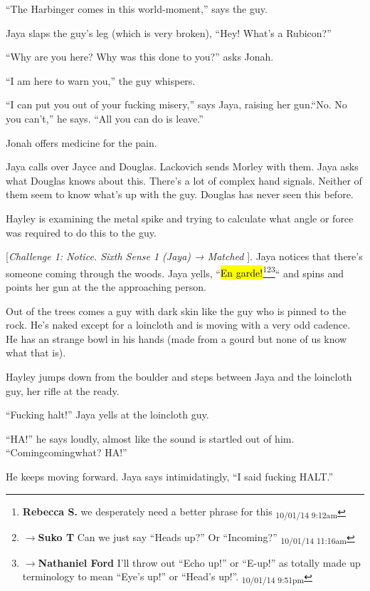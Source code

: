``The Harbinger comes in this world-moment,'' says the guy.

Jaya slaps the guy's leg (which is very broken), ``Hey!  What's a Rubicon?''

``Why are you here? Why was this done to you?'' asks Jonah.

``I am here to warn you,'' the guy whispers.

``I can put you out of your fucking misery,'' says Jaya, raising her gun.``No.  No you can't,'' he says.  ``All you can do is leave.''

Jonah offers medicine for the pain.

Jaya calls over Jayce and Douglas.  Lackovich sends Morley with them.  Jaya asks what Douglas knows about this. There's a lot of complex hand signals.  Neither of them seem to know what's up with the guy.  Douglas has never seen this before.

Hayley is examining the metal spike and trying to calculate what angle or force was required to do this to the guy.  



{[}\textit{Challenge 1: Notice.  Sixth Sense 1 (Jaya) → Matched }{]}.  Jaya notices that there's someone coming through the woods.  Jaya yells, ``\hl{En garde!}\footnote{\textbf{Rebecca S. }we desperately need a better phrase for this \textsubscript{10/01/14 9:12am}}\footnote{$\rightarrow$\textbf{Suko T }Can we just say ``Heads up?''  Or ``Incoming?'' \textsubscript{10/01/14 11:16am}}\footnote{$\rightarrow$\textbf{Nathaniel Ford }I'll throw out ``Echo up!'' or ``E-up!'' as totally made up terminology to mean ``Eye's up!'' or ``Head's up!''. \textsubscript{10/01/14 9:51pm}}`` and spins and points her gun at the the approaching person.

Out of the trees comes a guy with dark skin like the guy who is pinned to the rock.  He's naked except for a loincloth and is moving with a very odd cadence.  He has an strange bowl in his hands (made from a gourd but none of us know what that is).

Hayley jumps down from the boulder and steps between Jaya and the loincloth guy, her rifle at the ready.

``Fucking halt!'' Jaya yells at the loincloth guy.

``HA!'' he says loudly, almost like the sound is startled out of him.  ``Comingcomingwhat?  HA!''

He keeps moving forward.  Jaya says intimidatingly, ``I said fucking HALT.''

